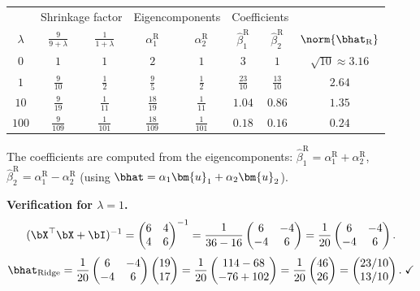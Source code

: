 \begin{example}
\begin{center}
\renewcommand{\arraystretch}{1.4}
\begin{tabular}{c|cc|cc|cc|c}
\toprule
& \multicolumn{2}{c|}{Shrinkage factor} & \multicolumn{2}{c|}{Eigencomponents} & \multicolumn{2}{c|}{Coefficients} & \\
$\lambda$ & $\frac{9}{9+\lambda}$ & $\frac{1}{1+\lambda}$ & $\alpha_1^{\text{R}}$ & $\alpha_2^{\text{R}}$ & $\hat\beta_1^{\text{R}}$ & $\hat\beta_2^{\text{R}}$ & $\norm{\bhat_{\text{R}}}$ \\
\midrule
$0$ & $1$ & $1$ & $2$ & $1$ & $3$ & $1$ & $\sqrt{10}\approx 3.16$ \\[2pt]
$1$ & $\frac{9}{10}$ & $\frac{1}{2}$ & $\frac{9}{5}$ & $\frac{1}{2}$ & $\frac{23}{10}$ & $\frac{13}{10}$ & $2.64$ \\[2pt]
$10$ & $\frac{9}{19}$ & $\frac{1}{11}$ & $\frac{18}{19}$ & $\frac{1}{11}$ & $1.04$ & $0.86$ & $1.35$ \\[2pt]
$100$ & $\frac{9}{109}$ & $\frac{1}{101}$ & $\frac{18}{109}$ & $\frac{1}{101}$ & $0.18$ & $0.16$ & $0.24$ \\
\bottomrule
\end{tabular}
\end{center}

The coefficients are computed from the eigencomponents:
$\hat\beta_1^{\text{R}} = \alpha_1^{\text{R}} + \alpha_2^{\text{R}}$,
$\hat\beta_2^{\text{R}} = \alpha_1^{\text{R}} - \alpha_2^{\text{R}}$
(using $\bhat = \alpha_1\bm{u}_1 + \alpha_2\bm{u}_2$).

\medskip\noindent\textbf{Verification for $\lambda=1$.}
\[
(\bX^\top\bX + \bI)^{-1} = \begin{pmatrix}6&4\\4&6\end{pmatrix}^{-1}
= \frac{1}{36-16}\begin{pmatrix}6&-4\\-4&6\end{pmatrix}
= \frac{1}{20}\begin{pmatrix}6&-4\\-4&6\end{pmatrix}.
\]
\[
\bhat_{\text{Ridge}} = \frac{1}{20}\begin{pmatrix}6&-4\\-4&6\end{pmatrix}\begin{pmatrix}19\\17\end{pmatrix}
= \frac{1}{20}\begin{pmatrix}114-68\\-76+102\end{pmatrix}
= \frac{1}{20}\begin{pmatrix}46\\26\end{pmatrix}
= \begin{pmatrix}23/10\\13/10\end{pmatrix}.\;\checkmark
\]


\end{example}
